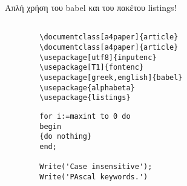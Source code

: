 \documentclass[a4paper]{article}
\begin{document}
	Απλή χρήση του babel και του πακέτου listings!
	
	\lstset{language=TeX,language=Pascal}
	\begin{lstlisting}
		
		\documentclass[a4paper]{article}
		\documentclass[a4paper]{article}
		\usepackage[utf8]{inputenc}
		\usepackage[T1]{fontenc}
		\usepackage[greek,english]{babel}
		\usepackage{alphabeta}
		\usepackage{listings}
	\end{lstlisting}
	\begin{lstlisting}
		for i:=maxint to 0 do
		begin
		{do nothing}
		end;
		
		Write('Case insensitive');
		Write('PAscal keywords.')
	\end{lstlisting}
\end{document}
